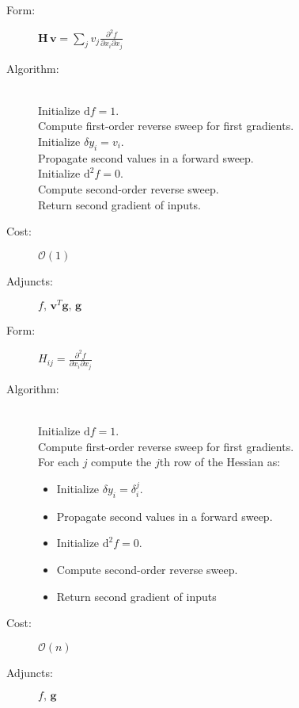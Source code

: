 \begin{tcolorbox}[colback=white,colframe=gray90, coltitle=black,boxrule=3pt,
fonttitle=\bfseries,title=Hessian-Vector Product]
	
	\begin{description}
		\item[Form:] $\displaystyle \mathbf{H} \, \mathbf{v} = \sum_{j} v_{j} \frac{ \partial^{2} f }{ \partial x_{i} \partial x_{j} } $
		\item[Algorithm:] \hfill \\
		Initialize $\mathrm{d} f = 1$. \\
		Compute first-order reverse sweep for first gradients. \\
		Initialize $\delta y_{i} = v_{i}$. \\
		Propagate second values in a forward sweep. \\
		Initialize $\mathrm{d}^{2} f = 0.$ \\
		Compute second-order reverse sweep. \\
		Return second gradient of inputs.
		\item[Cost:] $\mathcal{O} \! \left( 1 \right)$
		\item[Adjuncts:] $ f, \, \mathbf{v}^{T} \mathbf{g}, \, \mathbf{g}$
	\end{description}
	
\end{tcolorbox}

\begin{tcolorbox}[colback=white,colframe=gray90, coltitle=black,boxrule=3pt,
fonttitle=\bfseries,title=Hessian]
	
	\begin{description}
		\item[Form:] $\displaystyle H_{ij} = \frac{ \partial^{2} f }{ \partial x_{i} \partial x_{j} } $
		\item[Algorithm:] \hfill \\
		Initialize $\mathrm{d} f = 1$. \\
		Compute first-order reverse sweep for first gradients. \\
		For each $j$ compute the $j$th row of the Hessian as:
		\begin{itemize}
			\setlength{\itemsep}{0cm}
			\setlength{\parskip}{0cm}
			\item[] Initialize $\delta y_{i} = \delta^{j}_{i}$.
			\item[] Propagate second values in a forward sweep. 
			\item[] Initialize $\mathrm{d}^{2} f = 0.$
			\item[] Compute second-order reverse sweep.
			\item[] Return second gradient of inputs
		\end{itemize}
		\item[Cost:] $\mathcal{O} \! \left( n \right)$
		\item[Adjuncts:] $ f, \, \mathbf{g}$
	\end{description}
	
\end{tcolorbox}

